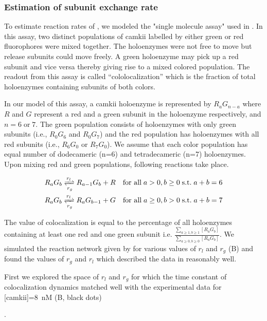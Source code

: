 \documentclass[9pt,lineno,doublespacing]{elife}
\begin{document}
{%
\subsubsection{Estimation of subunit exchange rate}\label{subsec:estimate_exchange_rate}

To estimate reaction rates of , we modeled the "single molecule
assay" used in \cite{stratton_activation-triggered_2014}. In this assay, two
distinct populations of \gls{camkii} labelled by either green or red
fluorophores were mixed together. The holoenzymes were not free to move but
release subunits could move freely. A green holoenzyme may pick up a red subunit
and vice versa thereby giving rise to a mixed colored population.  The readout
from this assay is called ``cololocalization'' which is the fraction of total
holoenzymes containing subunits of both colors.

In our model of this assay, a \gls{camkii} holoenzyme is represented by
$R_aG_{n-a}$ where $R$ and $G$ represent a red and a green subunit in the
holoenzyme respectively, and $n=6\;\text{or}\;7$. The green population consists
of holoenzymes with only green subunits (i.e., $R_0G_6$ and $R_0G_7$) and the
red population has holoenzymes with all red subunits (i.e., $R_6G_0$ or
$R_7G_0$). We assume that each color population has equal number of dodecameric
(n=6) and tetradecameric (n=7) holoenzymes. Upon mixing red and green
populations, following reactions take place.

\begin{equation}\label{eq:mixing_assay}
    \begin{gathered}
        R_aG_b \xrightleftharpoons[r_g]{r_l} R_{a-1}G_b + R 
        \quad \text{for all}\; a>0,b\ge 0\; \text{s.t.}\; a+b=6 \\
        R_aG_b \xrightleftharpoons[r_g]{r_l} R_{a}G_{b-1} + G 
        \quad \text{for all}\; a\ge 0,b> 0\; \text{s.t.}\; a+b=7
    \end{gathered}
\end{equation}

The value of colocalization is equal to the percentage of all holoenzymes
containing at least one red and one green subunit i.e. $\frac{\sum_{a\ge 1, b
\ge 1} [R_aG_b]}{ \sum_{a\ge0,b \ge 0}[R_aG_b]}$. We simulated the reaction
network given by  for various values of $r_l$ and $r_g$
(B) and  found the values of $r_g$ and $r_l$
which described the data in \cite{stratton_activation-triggered_2014} reasonably
well.

First we explored the space of $r_l$ and $r_g$ for which the time constant of
colocalization dynamics matched well with the experimental data for
[\gls{camkii}]=\SI{8}{\nano M} (B, black dots)}.
\end{document}
